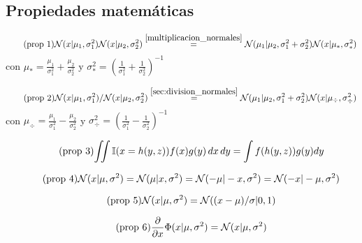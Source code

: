 \documentclass[article]{jss}
\newif\ifen
\newcommand{\en}[1]{\ifen#1\fi}
\newcommand{\N}{\mathcal{N}}
\begin{document}
\subsection{Propiedades matemáticas}\label{sec:propiedades}

\en{La eficiencia de TrueSkill Throguth Time tiene que ver con la posibilidad de resolver las marginales de forma analítica o aproximada.}
%
\en{En esta sección enumeramos las propiedades que necesitamos resolver los mensajes y las marginales de forma analítica y aproximada.}
%
\en{Invitamos a leer las demostraciones adjuntadas en el material suplementario.}
%
\begin{equation}\label{eq:propiedad_1} \tag{\text{prop 1}}
\N(x|\mu_1,\sigma_1^2)\N(x|\mu_2,\sigma_2^2) \overset{\ref{multiplicacion_normales}}{=} \N(\mu_1|\mu_2,\sigma_1^2+\sigma_2^2) \N(x|\mu_{*},\sigma_{*}^2)
\end{equation}
%
con $\mu_{*} = \frac{\mu_1}{\sigma_1^2} + \frac{\mu_2}{\sigma_2^2}$ y $\sigma_{*}^2 = \left(\frac{1}{\sigma_1^2} + \frac{1}{\sigma_2^2} \right)^{-1}$ 

\begin{equation}\label{eq:propiedad_2} \tag{\text{prop 2}}
\N(x|\mu_1,\sigma_1^2)/\N(x|\mu_2,\sigma_2^2) \overset{\ref{sec:division_normales}}{=} \N(\mu_1|\mu_2,\sigma_1^2+\sigma_2^2) \N(x|\mu_{\div},\sigma_{\div}^2)
\end{equation}
%
con $\mu_{\div} = \frac{\mu_1}{\sigma_1^2} - \frac{\mu_2}{\sigma_2^2}$ y $\sigma_{\div}^2 = \left(\frac{1}{\sigma_1^2} - \frac{1}{\sigma_2^2} \right)^{-1}$ 

\begin{equation}\label{eq:integral_con_indicadora} \tag{\text{prop 3}}
\begin{split}
 \iint  \mathbb{I}(x=h(y,z)) f(x) g(y)\, dx\, dy = \int f(h(y,z)) g(y) dy
 \end{split}
\end{equation}

\begin{equation}\label{eq:simetria} \tag{\text{prop 4}}
 \N(x|\mu,\sigma^2) = \N(\mu|x,\sigma^2) = \N(-\mu|-x,\sigma^2) = \N(-x|-\mu,\sigma^2) 
\end{equation}

\begin{equation}\label{eq:estandarizar} \tag{\text{prop 5}}
  \N(x|\mu,\sigma^2) = \N((x-\mu)/\sigma | 0, 1)
\end{equation}

\begin{equation}\label{eq:phi_norm} \tag{\text{prop 6}}
 \frac{\partial}{\partial x} \Phi(x|\mu,\sigma^2) = \N(x|\mu,\sigma^2)
\end{equation}
\end{document}
